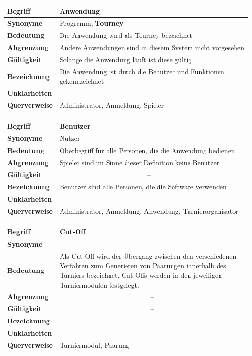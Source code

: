 \documentclass[11pt]{article}
\begin{document}
\newpage

\begin{tabularx}{\textwidth}{| p{} | p{} |}
	\hline
	\textbf{Begriff} & Anwendung\\
	\hline
	\textbf{Synonyme} & Programm, \textbf{Tourney}\\
	\hline
	\textbf{Bedeutung} & Die Anwendung wird als Tourney bezeichnet\\
	\hline
	\textbf{Abgrenzung} & Andere Anwendungen sind in diesem System nicht vorgesehen\\
	\hline
	\textbf{Gültigkeit} & Solange die Anwendung läuft ist diese gültig\\
	\hline
	\textbf{Bezeichnung} & Die Anwendung ist durch die Benutzer und Funktionen gekennzeichnet\\
	\hline
	\textbf{Unklarheiten} & \multicolumn{1}{c|}{--} \\
	\hline
	\textbf{Querverweise} & Administrator, Anmeldung, Spieler \\
	\hline
\end{tabularx}

\begin{tabularx}{\textwidth}{| p{} | p{} |}
	\hline
	\textbf{Begriff} & Benutzer\\
	\hline
	\textbf{Synonyme} & Nutzer\\
	\hline
	\textbf{Bedeutung} & Oberbegriff für alle Personen, die die Anwendung bedienen\\
	\hline
	\textbf{Abgrenzung} & Spieler sind im Sinne dieser Definition keine Benutzer \\
	\hline
	\textbf{Gültigkeit} & \multicolumn{1}{c|}{--} \\
	\hline
	\textbf{Bezeichnung} & Benutzer sind alle Personen, die die Software verwenden\\
	\hline
	\textbf{Unklarheiten} & \multicolumn{1}{c|}{--} \\
	\hline
	\textbf{Querverweise} & Administrator, Anmeldung, Anwendung, Turnierorganisator \\
	\hline
\end{tabularx}

\begin{tabularx}{\textwidth}{| p{} | p{} |}
	\hline
	\textbf{Begriff} & Cut-Off\\
	\hline
	\textbf{Synonyme} & \multicolumn{1}{c|}{--} \\
	\hline
	\textbf{Bedeutung} & Als Cut-Off wird der Übergang zwischen den verschiedenen Verfahren zum Generieren von Paarungen innerhalb des Turniers bezeichnet. Cut-Offs werden in den jeweiligen Turniermodulen festgelegt.\\
	\hline
	\textbf{Abgrenzung} & \multicolumn{1}{c|}{--} \\
	\hline
	\textbf{Gültigkeit} & \multicolumn{1}{c|}{--} \\
	\hline
	\textbf{Bezeichnung} & \multicolumn{1}{c|}{--} \\
	\hline
	\textbf{Unklarheiten} & \multicolumn{1}{c|}{--} \\
	\hline
	\textbf{Querverweise} & Turniermodul, Paarung \\
	\hline
\end{tabularx}
\end{document}
